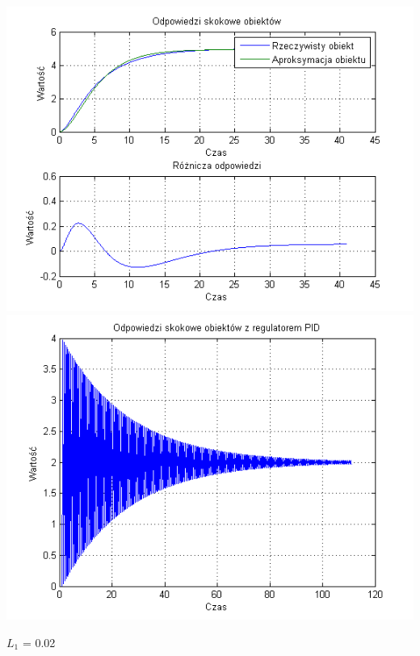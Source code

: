\documentclass[10pt,a4paper]{article}
\begin{document}
\begin{center}
\includegraphics[scale=1]{images/dwa/skrypt_189.png}\\
\includegraphics[scale=1]{images/dwa/skrypt_190.png}\\
\end{center}
\newpage
$L_1$ = 0.02
\end{document}

